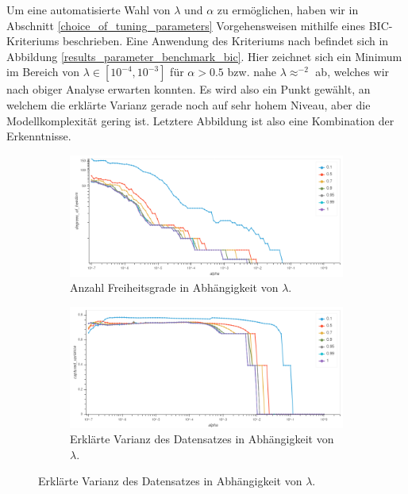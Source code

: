 Um eine automatisierte Wahl von $\lambda$ und $\alpha$ zu ermöglichen, haben wir in Abschnitt \ref{choice_of_tuning_parameters} Vorgehensweisen mithilfe eines BIC-Kriteriums beschrieben. Eine Anwendung des Kriteriums nach \cite{croux, guo} befindet sich in Abbildung \ref{results_parameter_benchmark_bic}. Hier zeichnet sich ein Minimum im Bereich von $\lambda \in [10^{-4}, 10^{-3}]$ für $\alpha > 0.5$ bzw. nahe $\lambda \approx ^{-2}$ ab, welches wir nach obiger Analyse erwarten konnten. Es wird also ein Punkt gewählt, an welchem die erklärte Varianz gerade noch auf sehr hohem Niveau, aber die Modellkomplexität gering ist. Letztere Abbildung ist also eine Kombination der Erkenntnisse.

\begin{figure}
\centering
\begin{subfigure}{0.9\textwidth}
\includegraphics[width=\textwidth]{figures/Signal_0_degrees_of_freedom.png}
\caption{Anzahl Freiheitsgrade in Abhängigkeit von $\lambda$.}
\label{results_parameter_benchmark_degrees_of_freedom}
\end{subfigure}
%
\begin{subfigure}{0.9\textwidth}
\includegraphics[width=\textwidth]{figures/Signal_0_explained_variances.png}
\caption{Erklärte Varianz des Datensatzes in Abhängigkeit von $\lambda$.}
\label{results_parameter_benchmark_explained_variance}
\end{subfigure}

\end{figure}
